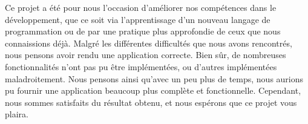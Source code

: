 \documentclass[../rapport.tex]{subfiles}
\begin{document}
Ce projet a été pour nous l'occasion d'améliorer nos compétences dans le développement, que ce soit via l'apprentissage d'un nouveau langage de programmation ou de par une pratique plus approfondie de ceux que nous connaissions déjà. Malgré les différentes difficultés que nous avons rencontrés, nous pensons avoir rendu une application correcte. Bien sûr, de nombreuses fonctionnalités n'ont pas pu être implémentées, ou d'autres implémentées maladroitement. Nous pensons ainsi qu'avec un peu plus de temps, nous aurions pu fournir une application beaucoup plus complète et fonctionnelle. Cependant, nous sommes satisfaits du résultat obtenu, et nous espérons que ce projet vous plaira.
\end{document}

